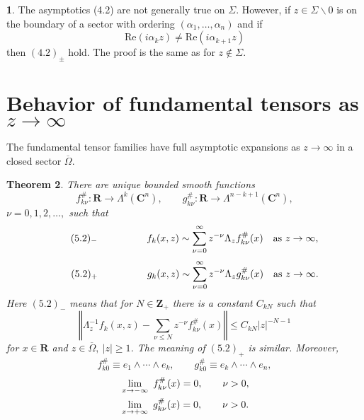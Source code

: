 \documentclass{surv-l}
\theoremstyle{plain}
\newtheorem{theorem}{Theorem}[section]
\theoremstyle{definition}
\newtheorem{remark}[theorem]{\sc{Remark}}
\numberwithin{equation}{chapter}
\begin{document}
\setcounter{theorem}{7}
\begin{remark}\label{chap01:thm4.8}
The asymptotics (4.2) are not generally true on $\Sigma$. However, if $z\in\Sigma\backslash 0$ is on the boundary of a sector with ordering $(\alpha_{1}, \ldots, \alpha_{n})$ and if
\setcounter{equation}{8}
\begin{equation}\label{eq4.9}
\mathrm{Re}(i\alpha_{k}z)\neq\mathrm{Re}(i\alpha_{k+1}z)
\end{equation}
then $(4.2)_{\pm}$ hold. The proof is the same as for $ z\not\in\Sigma$.
\end{remark}

\section{Behavior of fundamental tensors as $ z\rightarrow\infty$} The fundamental tensor families have full asymptotic expansions as $z \rightarrow\infty$ in a closed sector $\overline{\Omega}$.
\setcounter{theorem}{0}
\begin{theorem}\label{chap01:thm5.1}
There are unique bounded smooth functions
\begin{equation*}
f_{k\nu}^{\#}:\mathbf{R}\rightarrow\Lambda^{k}(\mathbf{C}^{n}),\qquad g_{k\nu}^{\#}:\mathbf{R}\rightarrow\Lambda^{n-k+1}(\mathbf{C}^{n}),
\end{equation*}
$\nu=0,1,2,\ldots,$ such that
\begin{equation*}
\tag*{$(5.2)_{-}$} \qquad \qquad \quad f_{k}(x, z)\displaystyle \sim\sum_{\nu=0}^{\infty}z^{-\nu}\Lambda_{z}f_{k\nu}^{\#}(x)\quad \mathrm{as}\ z\rightarrow\infty,
\end{equation*}
\begin{equation*}
\tag*{$(5.2)_{+}$} \qquad \qquad \quad g_{k}(x, z)\displaystyle \sim\sum_{\nu=0}^{\infty}z^{-\nu}\Lambda_{z}g_{k\nu}^{\#}(x)\quad \mathrm{as}\ z\rightarrow\infty.
\end{equation*}
Here $(5.2)_{-}$ means that for $N\in \mathbf{Z}_{+}$ there is a constant $C_{kN}$ such that
\renewcommand{\theequation}{\thesection.\arabic{equation}}
\setcounter{equation}{2}
\begin{equation}\label{eq5.3}
\left\Vert\Lambda_{z}^{-1}f_{k}(x,z)-\sum_{\nu\leq N}z^{-\nu}f_{k\nu}^{\#}(x)\right\Vert\leq C_{kN}|z|^{-N-1}
\end{equation}
for $x\in \mathbf{R}$ and $z\in\overline{\Omega},\ |z|\geq 1$. The meaning of $(5.2)_{+}$ is similar. Moreover,
\begin{equation}\label{eq5.4}
f_{k0}^{\#}\equiv e_{1}\wedge\cdots \wedge e_{k},\qquad  g_{k0}^{\#}\equiv e_{k}\wedge\cdots \wedge e_{n},
\end{equation}
\begin{align}\label{eq5.5}
&\lim_{x\rightarrow-\infty}\ f_{k\nu}^{\#}(x)=0,\qquad \nu >0,\\ \notag
&\lim_{x\rightarrow+\infty}\ g_{k\nu}^{\#}(x)=0,\qquad \nu >0.
\end{align}
\end{theorem}
\end{document}
